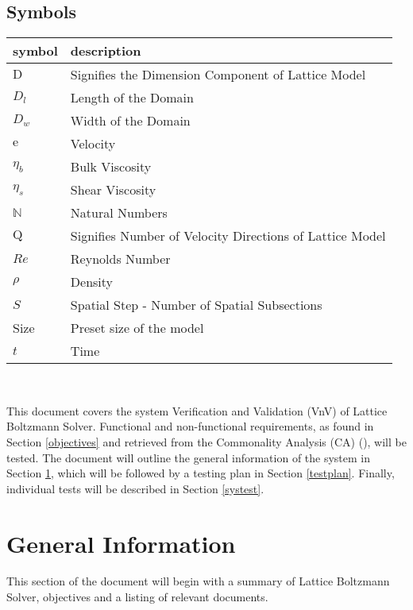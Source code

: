 \documentclass[12pt, titlepage]{article}
\newcommand{\famname}{Lattice Boltzmann Solver}
\begin{document}
\subsection{Symbols}
\label{svnvsymbols}
\renewcommand{\arraystretch}{1.2}
\begin{tabular}{l l} 
  \toprule		
  \textbf{symbol} & \textbf{description}\\
  \midrule 
  $\mathrm{D}$ & Signifies the Dimension Component of Lattice Model\\
  $D_{l}$ & Length of the Domain\\
  $D_{w}$ & Width of the Domain\\
  $\mathrm{e}$ & Velocity\\
  $\eta_b$ & Bulk Viscosity \\
  $\eta_s$ & Shear Viscosity \\
  $\mathbb{N}$ & Natural Numbers\\
  $\mathrm{Q}$ & Signifies Number of Velocity Directions of Lattice Model\\
  $Re$ & Reynolds Number\\
  $\rho$ & Density \\
  $S$ & Spatial Step - Number of Spatial Subsections\\
  Size & Preset size of the model\\
  $t$ & Time \\
  \bottomrule
\end{tabular}\\

\newpage


\noindent This document covers the system Verification and Validation (VnV) of
\famname . Functional and non-functional requirements, as found in Section
\ref{objectives} and retrieved from the Commonality Analysis (CA)
(\citet{LBM_CA_PM}), will be tested. The document will outline the general
information of the system in Section \ref{generalinfo}, which will be followed
by a testing plan in Section \ref{testplan}. Finally, individual tests will be
described in Section \ref{systest}.

\section{General Information} \label{generalinfo}
This section of the document will begin with a summary of {\famname}, objectives and a listing of relevant documents.
\end{document}
